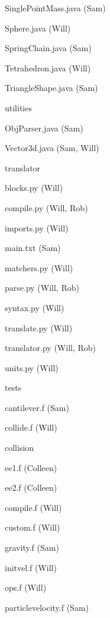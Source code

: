 \begin{description}
\begin{description}
\begin{description}
    \item SinglePointMass.java (Sam)
    \item Sphere.java (Will)
    \item SpringChain.java (Sam)
    \item Tetrahedron.java (Will)
    \item TriangleShape.java (Sam)
    \end{description}
  \item utilities
    \begin{description}
    \item ObjParser.java (Sam)
    \item Vector3d.java (Sam, Will)
    \end{description}
  \end{description}
\item translator
  \begin{description}
  \item blocks.py (Will)
  \item compile.py (Will, Rob)
  \item imports.py (Will)
  \item main.txt (Sam)
  \item matchers.py (Will)
  \item parse.py (Will, Rob)
  \item syntax.py (Will)
  \item translate.py (Will)
  \item translator.py (Will, Rob)
  \item units.py (Will)
  \end{description}
\item tests
  \begin{description}
  \item cantilever.f (Sam)
  \item collide.f (Will)
  \item collision
    \begin{description}
    \item ee1.f (Colleen)
    \item ee2.f (Colleen)
    \end{description}
  \item compile.f (Will)
  \item custom.f (Will) 
  \item gravity.f (Sam)
  \item initvel.f (Will)
  \item ops.f (Will)
  \item particlevelocity.f (Sam)

\end{description}
\end{description}
